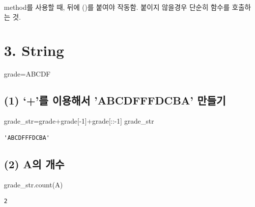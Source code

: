 \documentclass[
  letterpaper,
  DIV=11,
  numbers=noendperiod]{scrreprt}
\newenvironment{Shaded}{\begin{snugshade}}{\end{snugshade}}
\newcommand{\DecValTok}[1]{\textcolor[rgb]{0.68,0.00,0.00}{#1}}
\newcommand{\NormalTok}[1]{\textcolor[rgb]{0.00,0.23,0.31}{#1}}
\newcommand{\OperatorTok}[1]{\textcolor[rgb]{0.37,0.37,0.37}{#1}}
\newcommand{\StringTok}[1]{\textcolor[rgb]{0.13,0.47,0.30}{#1}}
\begin{document}
method를 사용할 때, 뒤에 ()를 붙여야 작동함. 붙이지 않을경우 단순히
함수를 호출하는 것.

\section*{3. String}\label{string}


\begin{Shaded}
\begin{Highlighting}[]
\NormalTok{grade}\OperatorTok{=}\StringTok{\textquotesingle{}ABCDF\textquotesingle{}}
\end{Highlighting}
\end{Shaded}

\subsection*{(1) `+'를 이용해서 'ABCDFFFDCBA'
만들기}\label{uxb97c-uxc774uxc6a9uxd574uxc11c-abcdfffdcba-uxb9ccuxb4e4uxae30}

\begin{Shaded}
\begin{Highlighting}[]
\NormalTok{grade\_str}\OperatorTok{=}\NormalTok{grade}\OperatorTok{+}\NormalTok{grade[}\OperatorTok{{-}}\DecValTok{1}\NormalTok{]}\OperatorTok{+}\NormalTok{grade[::}\OperatorTok{{-}}\DecValTok{1}\NormalTok{]}
\NormalTok{grade\_str}
\end{Highlighting}
\end{Shaded}

\begin{verbatim}
'ABCDFFFDCBA'
\end{verbatim}

\subsection*{(2) A의 개수}\label{auxc758-uxac1cuxc218}

\begin{Shaded}
\begin{Highlighting}[]
\NormalTok{grade\_str.count(}\StringTok{\textquotesingle{}A\textquotesingle{}}\NormalTok{)}
\end{Highlighting}
\end{Shaded}

\begin{verbatim}
2
\end{verbatim}
\end{document}
